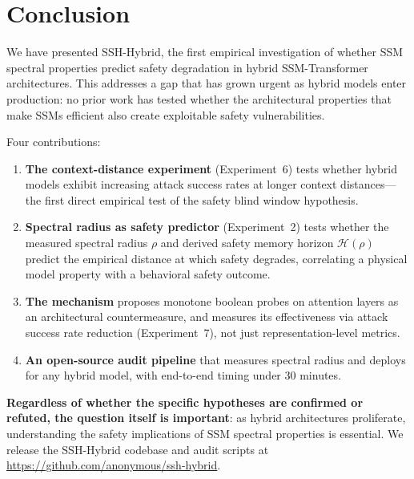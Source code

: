 \documentclass{article}
\newcommand{\Horizon}{\mathcal{H}(\rho)}
\newcommand{\MBCA}{\mathrm{MBCA}}
\begin{document}
\section{Conclusion}
\label{sec:conclusion}

We have presented SSH-Hybrid, the first empirical investigation of whether SSM spectral
properties predict safety degradation in hybrid SSM-Transformer architectures. This
addresses a gap that has grown urgent as hybrid models enter production: no prior work
has tested whether the architectural properties that make SSMs efficient also create
exploitable safety vulnerabilities.

Four contributions:

\begin{enumerate}[label=(\arabic*)]
\item \textbf{The context-distance experiment} (Experiment~6) tests whether hybrid models
exhibit increasing attack success rates at longer context distances---the first direct
empirical test of the safety blind window hypothesis.

\item \textbf{Spectral radius as safety predictor} (Experiment~2) tests whether the
measured spectral radius $\rho$ and derived safety memory horizon $\Horizon$ predict the
empirical distance at which safety degrades, correlating a physical model property with
a behavioral safety outcome.

\item \textbf{The \MBCA{} mechanism} proposes monotone boolean probes on attention layers
as an architectural countermeasure, and measures its effectiveness via attack success
rate reduction (Experiment~7), not just representation-level metrics.

\item \textbf{An open-source audit pipeline} that measures spectral radius and deploys
\MBCA{} for any hybrid model, with end-to-end timing under 30 minutes.
\end{enumerate}

\textbf{Regardless of whether the specific hypotheses are confirmed or refuted, the
question itself is important}: as hybrid architectures proliferate, understanding the
safety implications of SSM spectral properties is essential. We release the SSH-Hybrid
codebase and audit scripts at \url{https://github.com/anonymous/ssh-hybrid}.

\end{document}
